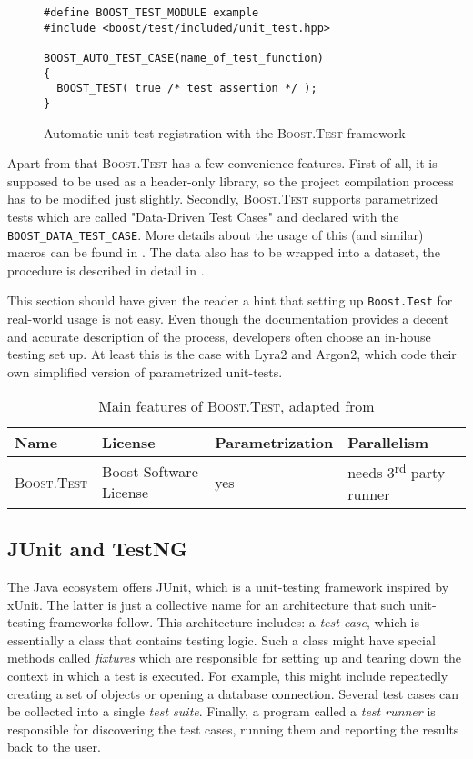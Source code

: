 \begin{figure}
\centering
\begin{verbatim}
#define BOOST_TEST_MODULE example
#include <boost/test/included/unit_test.hpp>

BOOST_AUTO_TEST_CASE(name_of_test_function)
{
  BOOST_TEST( true /* test assertion */ );
}
  \end{verbatim}
  \caption{Automatic unit test registration with the \textsc{Boost.Test} framework}
  \label{figure:boost-auto-test-case}
  \end{figure}

Apart from that \textsc{Boost.Test} has a few convenience features. First of all, it is supposed to be used as a header-only library, so the project compilation process has to be modified just slightly. Secondly, \textsc{Boost.Test} supports parametrized tests which are called "Data-Driven Test Cases" and declared with the \texttt{BOOST_DATA_TEST_CASE}. More details about the usage of this (and similar) macros can be found in \cite{boost:2017:test-docs-data-macro}. The data also has to be wrapped into a dataset, the procedure is described in detail in \cite{boost:2017:test-docs-dataset}.

This section should have given the reader a hint that setting up \texttt{Boost.Test} for real-world usage is not easy. Even though the documentation provides a decent and accurate description of the process, developers often choose an in-house testing set up. At least this is the case with Lyra2 and Argon2, which code their own simplified version of parametrized unit-tests.

\begin{table}
\begin{tabular}{llll}
    Name & License & Parametrization & Parallelism \\ \hline
\textsc{Boost.Test} & Boost Software License & yes & needs 3\textsuperscript{rd} party runner
\end{tabular}
\caption{Main features of \textsc{Boost.Test}, adapted from \cite{wiki:2017:frameworks-cpp}}
\label{table:framework-features-cpp}
\end{table}

\subsection{JUnit and TestNG}
\label{sec:unit-junit-testng}

The Java ecosystem offers JUnit, which is a unit-testing framework inspired by xUnit. The latter is just a collective name for an architecture that such unit-testing frameworks follow. This architecture includes: a \emph{test case}, which is essentially a class that contains testing logic. Such a class might have special methods called \emph{fixtures} which are responsible for setting up and tearing down the context in which a test is executed. For example, this might include repeatedly creating a set of objects or opening a database connection. Several test cases can be collected into a single \emph{test suite}. Finally, a program called a \emph{test runner} is responsible for discovering the test cases, running them and reporting the results back to the user.

